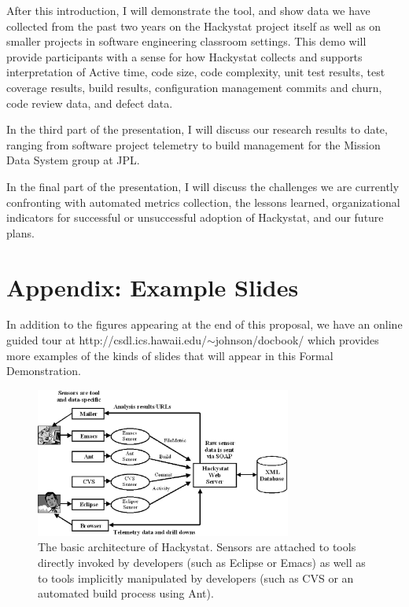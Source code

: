\documentclass[11pt,twocolumn]{article}
\begin{document}
After this introduction, I will demonstrate the tool, and show data we have
collected from the past two years on the Hackystat project itself as well
as on smaller projects in software engineering classroom settings.  This
demo will provide participants with a sense for how Hackystat collects and
supports interpretation of Active time, code size, code complexity, unit
test results, test coverage results, build results, configuration
management commits and churn, code review data, and defect data.

In the third part of the presentation, I will discuss our research results
to date, ranging from software project telemetry to build management for the
Mission Data System group at JPL.

In the final part of the presentation, I will discuss the challenges we are
currently confronting with automated metrics collection, the lessons learned, 
organizational indicators for successful or unsuccessful adoption of Hackystat,
and our future plans.


\section{Appendix: Example Slides}

In addition to the figures appearing at the end of this proposal, we have an online guided tour at
http://csdl.ics.hawaii.edu/$\sim$johnson/docbook/ which provides more examples
of the kinds of slides that will appear in this Formal Demonstration.

\begin{figure}[h]
  \centering
  \includegraphics[width=0.75\textwidth]{architecture.eps}
  \caption{The basic architecture of Hackystat. Sensors are attached to
  tools directly invoked by developers (such as Eclipse or Emacs) as
  well as to tools implicitly manipulated by developers (such as CVS or 
  an automated build process using Ant).}
  \label{fig:architecture}
\end{figure}
\end{document}
